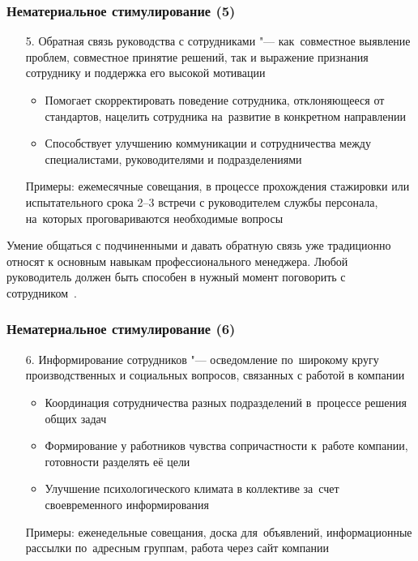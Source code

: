 \documentclass{../industrial-development}
\begin{document}
\begin{frame} \frametitle{Нематериальное стимулирование (5)}
	
	\begin{itemize}
		\item[5.] \alert{Обратная связь руководства с сотрудниками} "--- как~совместное выявление проблем, совместное принятие решений, так и выражение признания сотруднику и поддержка его высокой мотивации
		\begin{itemize}
			\item Помогает скорректировать поведение сотрудника, отклоняющееся от стандартов, нацелить сотрудника на~развитие в конкретном направлении
			\item Способствует улучшению коммуникации и сотрудничества между специалистами, руководителями и подразделениями
		\end{itemize}
		Примеры: ежемесячные совещания, в процессе прохождения стажировки или испытательного срока 2--3 встречи с руководителем службы персонала, на~которых проговариваются необходимые вопросы
	\end{itemize}
\end{frame}

\lecturenotes

Умение общаться с подчиненными и давать  обратную связь уже традиционно относят  к основным навыкам профессионального менеджера.  Любой руководитель должен быть способен в нужный момент поговорить с сотрудником~\cite{VchemosobenIT}.

\begin{frame} \frametitle{Нематериальное стимулирование (6)}
	\begin{itemize}
		\item[6.] \alert{Информирование сотрудников} "--- осведомление по~широкому кругу производственных и социальных вопросов, связанных с работой в компании
		\begin{itemize}
			\item Координация сотрудничества разных подразделений в~процессе решения общих задач
			\item Формирование у работников чувства сопричастности к~работе компании, готовности разделять её цели
			\item Улучшение психологического климата в коллективе за~счет своевременного информирования
		\end{itemize}
		Примеры: еженедельные совещания, доска для~объявлений, информационные рассылки по~адресным группам, работа через сайт компании
	\end{itemize}
\end{frame}
\end{document}
